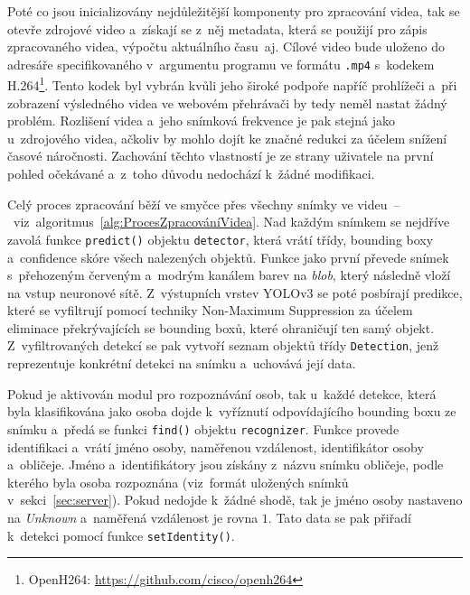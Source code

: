 \newpage
Poté co jsou inicializovány nejdůležitější komponenty pro zpracování videa, tak se otevře zdrojové video a~získají se z~něj metadata, která se použijí pro zápis zpracovaného videa, výpočtu aktuálního času~aj. Cílové video bude uloženo do adresáře specifikovaného v~argumentu programu ve formátu \texttt{.mp4} s~kodekem H.264\footnote{OpenH264: \url{https://github.com/cisco/openh264}}. Tento kodek byl vybrán kvůli jeho široké podpoře napříč prohlížeči a~při zobrazení výsledného videa ve webovém přehrávači by tedy neměl nastat žádný problém. Rozlišení videa a~jeho snímková frekvence je pak stejná jako u~zdrojového videa, ačkoliv by mohlo dojít ke značné redukci za účelem snížení časové náročnosti. Zachování těchto vlastností je ze strany uživatele na první pohled očekávané a~z~toho důvodu nedochází k~žádné modifikaci.

Celý proces zpracování běží ve smyčce přes všechny snímky ve videu~--~viz~algoritmus~\ref{alg:ProcesZpracováníVidea}. Nad každým snímkem se nejdříve zavolá funkce \texttt{predict()} objektu \texttt{detector}, která vrátí třídy, bounding boxy a~confidence skóre všech nalezených objektů. Funkce jako první převede snímek s~přehozeným červeným a~modrým kanálem barev na \emph{blob}, který následně vloží na vstup neuronové sítě. Z~výstupních vrstev YOLOv3 se poté posbírají predikce, které se vyfiltrují pomocí techniky Non-Maximum Suppression za účelem eliminace překrývajících se bounding boxů, které ohraničují ten samý objekt. Z~vyfiltrovaných detekcí se pak vytvoří seznam objektů třídy \texttt{Detection}, jenž reprezentuje konkrétní detekci na snímku a~uchovává její data.

Pokud je aktivován modul pro rozpoznávání osob, tak u~každé detekce, která byla klasifikována jako osoba dojde k~vyříznutí odpovídajícího bounding boxu ze snímku a~předá se funkci \texttt{find()} objektu \texttt{recognizer}. Funkce provede identifikaci a~vrátí jméno osoby, naměřenou vzdálenost, identifikátor osoby a~obličeje. Jméno a~identifikátory jsou získány z~názvu snímku obličeje, podle kterého byla osoba rozpoznána (viz~formát uložených snímků v~sekci~\ref{sec:server}). Pokud nedojde k~žádné shodě, tak je jméno osoby nastaveno na \emph{Unknown} a~naměřená vzdálenost je rovna $1$. Tato data se pak přiřadí k~detekci pomocí funkce \texttt{setIdentity()}.

